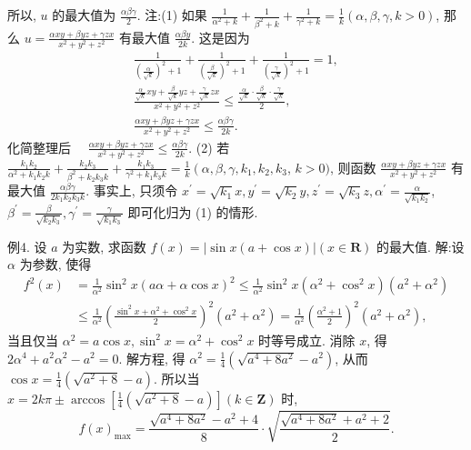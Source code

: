 所以, $u$ 的最大值为 $\frac{\alpha \beta \gamma}{2}$.
注:(1) 如果 $\frac{1}{\alpha^2+k}+\frac{1}{\beta^2+k}+\frac{1}{\gamma^2+k}=\frac{1}{k}(\alpha, \beta, \gamma, k>0)$, 那么 $u= \frac{\alpha x y+\beta y z+\gamma z x}{x^2+y^2+z^2}$ 有最大值 $\frac{\alpha \beta y}{2 k}$.
这是因为
$$
\begin{gathered}
\frac{1}{\left(\frac{\alpha}{\sqrt{k}}\right)^2+1}+\frac{1}{\left(\frac{\beta}{\sqrt{k}}\right)^2+1}+\frac{1}{\left(\frac{\gamma}{\sqrt{k}}\right)^2+1}=1, \\
\frac{\frac{\alpha}{\sqrt{k}} x y+\frac{\beta}{\sqrt{k}} y z+\frac{\gamma}{\sqrt{k}} z x}{x^2+y^2+z^2} \leqslant \frac{\frac{\alpha}{\sqrt{k}} \cdot \frac{\beta}{\sqrt{k}} \cdot \frac{\gamma}{\sqrt{k}}}{2}, \\
\frac{\alpha x y+\beta y z+\gamma z x}{x^2+y^2+z^2} \leqslant \frac{\alpha \beta \gamma}{2 k} .
\end{gathered}
$$
化简整理后 $\quad \frac{\alpha x y+\beta y z+\gamma z x}{x^2+y^2+z^2} \leqslant \frac{\alpha \beta \gamma}{2 k}$.
(2) 若 $\frac{k_1 k_2}{\alpha^2+k_1 k_2 k}+\frac{k_2 k_3}{\beta^2+k_2 k_3 k}+\frac{k_1 k_3}{\gamma^2+k_1 k_3 k}=\frac{1}{k}\left(\alpha, \beta, \gamma, k_1, k_2, k_3\right.$, $k>0)$, 则函数 $\frac{\alpha x y+\beta y z+\gamma z x}{x^2+y^2+z^2}$ 有最大值 $\frac{\alpha \beta \gamma}{2 k_1 k_2 k_3 k}$.
事实上, 只须令 $x^{\prime}=\sqrt{k_1} x, y^{\prime}=\sqrt{k_2} y, z^{\prime}=\sqrt{k_3} z, \alpha^{\prime}=\frac{\alpha}{\sqrt{k_1 k_2}}$, $\beta^{\prime}=\frac{\beta}{\sqrt{k_2 k_3}}, \gamma^{\prime}=\frac{\gamma}{\sqrt{k_1 k_3}}$ 即可化归为 (1) 的情形.



例4. 设 $a$ 为实数, 求函数 $f(x)=|\sin x(a+\cos x)|(x \in \mathbf{R})$ 的最大值.
解:设 $\alpha$ 为参数, 使得
$$
\begin{aligned}
f^2(x) & =\frac{1}{\alpha^2} \sin ^2 x(a \alpha+\alpha \cos x)^2 \leqslant \frac{1}{\alpha^2} \sin ^2 x\left(\alpha^2+\cos ^2 x\right)\left(a^2+\alpha^2\right) \\
& \leqslant \frac{1}{\alpha^2}\left(\frac{\sin ^2 x+\alpha^2+\cos ^2 x}{2}\right)^2\left(a^2+\alpha^2\right)=\frac{1}{\alpha^2}\left(\frac{\alpha^2+1}{2}\right)^2\left(a^2+\alpha^2\right),
\end{aligned}
$$
当且仅当 $\alpha^2=a \cos x, \sin ^2 x=\alpha^2+\cos ^2 x$ 时等号成立.
消除 $x$, 得 $2 \alpha^4+a^2 \alpha^2-a^2=0$.
解方程, 得 $\alpha^2=\frac{1}{4}\left(\sqrt{a^4+8 a^2}-a^2\right)$, 从而 $\cos x=\frac{1}{4}\left(\sqrt{a^2+8}-a\right)$.
所以当 $x=2 k \pi \pm \arccos \left[\frac{1}{4}\left(\sqrt{a^2+8}-a\right)\right](k \in \mathbf{Z})$ 时,
$$
f(x)_{\max }=\frac{\sqrt{a^4+8 a^2}-a^2+4}{8} \cdot \sqrt{\frac{\sqrt{a^4+8 a^2}+a^2+2}{2}} .
$$



